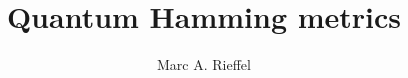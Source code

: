 \documentclass{amsart}[14pt]
\theoremstyle{definition}
\theoremstyle{remark}
\newcommand{\<}{\langle}
\renewcommand{\>}{\rangle}
\numberwithin{equation}{section}
\begin{document}
\title[Quantum Hamming metrics ]
{Quantum Hamming metrics}

\author{Marc A. Rieffel}
\address{Department of Mathematics\\
University of California\\
Berkeley, CA\ \ 94720-3840}
   

\end{document}
